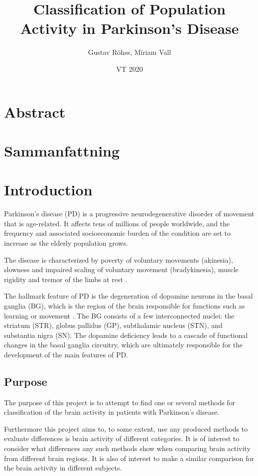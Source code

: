 \documentclass{article}
\title{Classification of Population Activity in Parkinson's Disease}
\author{Gustav Röhss, Míriam Vall}
\date{VT 2020}
\begin{document}
\maketitle

\section*{Abstract}
\section*{Sammanfattning}

\newpage
\tableofcontents

\newpage
\section{Introduction}

Parkinson's disease (PD) is a progressive neurodegenerative disorder of movement that is age-related. 
It affects tens of millions of people worldwide, and the frequency and associated socioeconomic burden of the condition are set to increase as the elderly population grows.

The disease is characterized by poverty of voluntary movements (akinesia), slowness and impaired scaling of voluntary movement (bradykinesia), muscle rigidity and tremor of the limbs at rest \citep{DeMaags}.

The hallmark feature of PD is the degeneration of dopamine neurons in the basal ganglia (BG), which is the region of the brain responsible for functions such as learning or movement \citep{Hammond}. 
The BG consists of a few interconnected nuclei: the striatum (STR), globus pallidus (GP), subthalamic nucleus (STN), and substantia nigra (SN). 
The dopamine deficiency leads to a cascade of functional changes in the basal ganglia circuitry, which are ultimately responsible for the development of the main features of PD.

\subsection{Purpose}

The purpose of this project is to attempt to find one or several methods for classification of the brain activity in patients with Parkinson's disease.

Furthermore this project aims to, to some extent, use any produced methods to evaluate differences is brain activity of different categories.
It is of interest to consider what differences any such methods show when comparing brain activity from different brain regions.
It is also of interest to make a similar comparison for the brain activity in different subjects.
\end{document}
